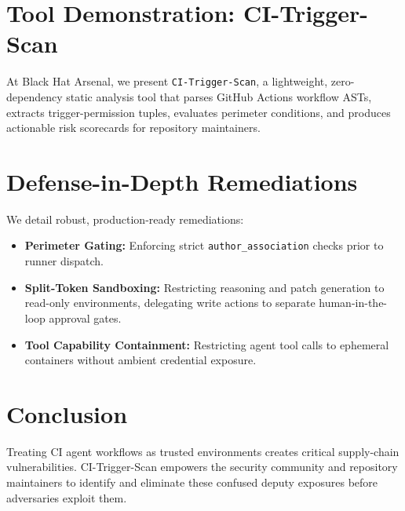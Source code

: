 \documentclass[11pt,a4paper]{article}
\begin{document}
\section{Tool Demonstration: CI-Trigger-Scan}
At Black Hat Arsenal, we present \texttt{CI-Trigger-Scan}, a lightweight, zero-dependency static analysis tool that parses GitHub Actions workflow ASTs, extracts trigger-permission tuples, evaluates perimeter conditions, and produces actionable risk scorecards for repository maintainers.

\section{Defense-in-Depth Remediations}
We detail robust, production-ready remediations:
\begin{itemize}
    \item \textbf{Perimeter Gating:} Enforcing strict \texttt{author\_association} checks prior to runner dispatch.
    \item \textbf{Split-Token Sandboxing:} Restricting reasoning and patch generation to read-only environments, delegating write actions to separate human-in-the-loop approval gates.
    \item \textbf{Tool Capability Containment:} Restricting agent tool calls to ephemeral containers without ambient credential exposure.
\end{itemize}

\section{Conclusion}
Treating CI agent workflows as trusted environments creates critical supply-chain vulnerabilities. CI-Trigger-Scan empowers the security community and repository maintainers to identify and eliminate these confused deputy exposures before adversaries exploit them.
\end{document}
